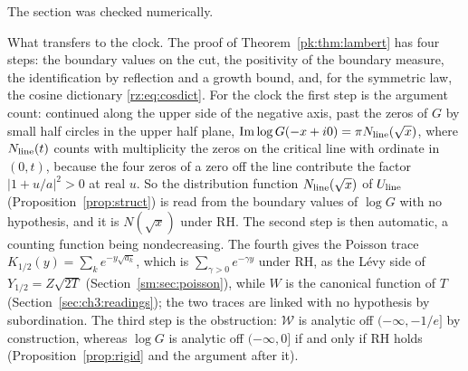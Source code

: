 The section was checked numerically.

What transfers to the clock. The proof of Theorem~\ref{pk:thm:lambert} has four steps: the boundary values on the cut, the positivity of the boundary measure, the identification by reflection and a growth bound, and, for the symmetric law, the cosine dictionary \eqref{rz:eq:cosdict}. For the clock the first step is the argument count: continued along the upper side of the negative axis, past the zeros of $G$ by small half circles in the upper half plane, $\operatorname{Im}\log G(-x+i0)=\pi N_{\rm line}(\sqrt x)$, where $N_{\rm line}(t)$ counts with multiplicity the zeros on the critical line with ordinate in $(0,t)$, because the four zeros of a zero off the line contribute the factor $|1+u/a|^2>0$ at real $u$. So the distribution function $N_{\rm line}(\sqrt x)$ of $U_{\rm line}$ (Proposition~\ref{prop:struct}) is read from the boundary values of $\log G$ with no hypothesis, and it is $N(\sqrt x)$ under RH. The second step is then automatic, a counting function being nondecreasing. The fourth gives the Poisson trace $K_{1/2}(y)=\sum_ke^{-y\sqrt{a_k}}$, which is $\sum_{\gamma>0}e^{-\gamma y}$ under RH, as the L\'evy side of $Y_{1/2}=Z\sqrt{2T}$ (Section~\ref{sm:sec:poisson}), while $W$ is the canonical function of $T$ (Section~\ref{sec:ch3:readings}); the two traces are linked with no hypothesis by subordination. The third step is the obstruction: $\mathcal W$ is analytic off $(-\infty,-1/e]$ by construction, whereas $\log G$ is analytic off $(-\infty,0]$ if and only if RH holds (Proposition~\ref{prop:rigid} and the argument after it).
